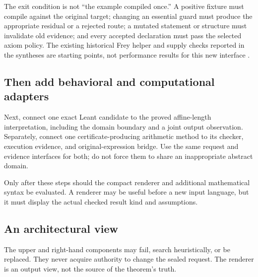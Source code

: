 \documentclass[11pt,a4paper]{article}
\theoremstyle{definition}
\theoremstyle{remark}
\newcommand{\code}[1]{\texttt{\detokenize{#1}}}
\begin{document}
The exit condition is not ``the example compiled once.'' A positive fixture
must compile against the original target; changing an essential guard must
produce the appropriate residual or a rejected route; a mutated statement or
structure must invalidate old evidence; and every accepted declaration must
pass the selected axiom policy. The existing historical Frey helper and supply
checks reported in the syntheses are starting points, not performance results
for this new interface \cite{synA,synB}.

\subsection{Then add behavioral and computational adapters}
Next, connect one exact Leant candidate to the proved affine-length
interpretation, including the \code{List Empty} domain boundary and a joint
output observation. Separately, connect one certificate-producing arithmetic
method to its checker, execution evidence, and original-expression bridge.
Use the same request and evidence interfaces for both; do not force them to
share an inappropriate abstract domain.

Only after these steps should the compact renderer and additional mathematical
syntax be evaluated. A renderer may be useful before a new input language, but
it must display the actual checked result kind and assumptions.

\subsection{An architectural view}
\begin{center}
\end{center}
The upper and right-hand components may fail, search heuristically, or be
replaced. They never acquire authority to change the sealed request. The
renderer is an output view, not the source of the theorem's truth.
\end{document}
